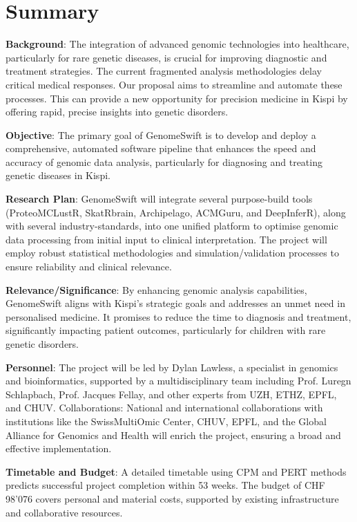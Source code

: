 \section{Summary}

\textbf{Background}: The integration of advanced genomic technologies into healthcare, particularly for rare genetic diseases, is crucial for improving diagnostic and treatment strategies. The current fragmented analysis methodologies delay critical medical responses. Our proposal aims to streamline and automate these processes. This can provide a new opportunity for precision medicine in Kispi by offering rapid, precise insights into genetic disorders.

\textbf{Objective}: The primary goal of GenomeSwift is to develop and deploy a comprehensive, automated software pipeline that enhances the speed and accuracy of genomic data analysis, particularly for diagnosing and treating genetic diseases in Kispi.

\textbf{Research Plan}: GenomeSwift will integrate several purpose-build tools (ProteoMCLustR, SkatRbrain, Archipelago, ACMGuru, and DeepInferR), along with several industry-standards, into one unified platform to optimise genomic data processing from initial input to clinical interpretation. The project will employ robust statistical methodologies and simulation/validation processes to ensure reliability and clinical relevance.

\textbf{Relevance/Significance}: By enhancing genomic analysis capabilities, GenomeSwift aligns with Kispi’s strategic goals and addresses an unmet need in personalised medicine. It promises to reduce the time to diagnosis and treatment, significantly impacting patient outcomes, particularly for children with rare genetic disorders.

\textbf{Personnel}: The project will be led by Dylan Lawless, a specialist in genomics and bioinformatics, supported by a multidisciplinary team including Prof. Luregn Schlapbach, Prof. Jacques Fellay, and other experts from UZH, ETHZ, EPFL, and CHUV.
Collaborations: National and international collaborations with institutions like the SwissMultiOmic Center, CHUV, EPFL, and the Global Alliance for Genomics and Health will enrich the project, ensuring a broad and effective implementation.

\textbf{Timetable and Budget}: A detailed timetable using CPM and PERT methods predicts successful project completion within 53 weeks. The budget of CHF 98’076 covers personal and material costs, supported by existing infrastructure and collaborative resources.